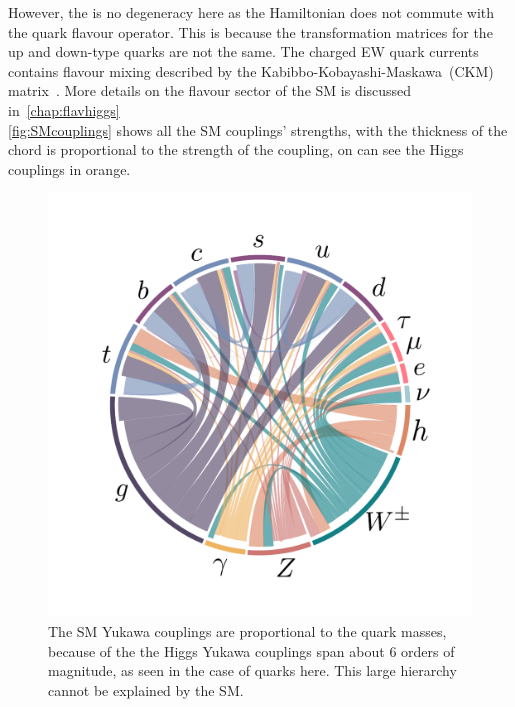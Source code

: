 However, the is no degeneracy here as the Hamiltonian does not commute with the quark flavour operator. This is because the transformation matrices for the up and down-type quarks are not the same.  The charged EW quark currents contains flavour mixing described by the Kabibbo-Kobayashi-Maskawa~(CKM) matrix~\cite{PhysRevLett.10.531,10.1143/PTP.49.652}. More details on the flavour sector of the SM is discussed in~\autoref{chap:flavhiggs}\\
\autoref{fig:SMcouplings} shows all the SM couplings' strengths, with the thickness of the chord is proportional to the strength of the coupling, on can see the Higgs couplings in orange. 
\begin{figure}[htpb!]
    \centering
    \includegraphics[width=\linewidth]{./figures/SM}
    \caption{The SM Yukawa couplings are proportional to the quark masses, because of the the Higgs Yukawa couplings span about $6$ orders of magnitude, as seen in the case of quarks here. This large hierarchy cannot be explained by the SM. }  \label{fig:SMcouplings}
\end{figure}

